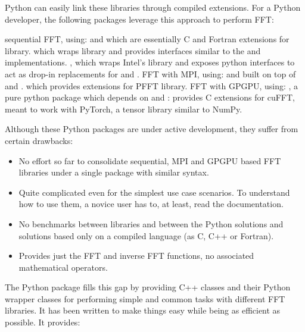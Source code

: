 Python can easily link these libraries through compiled extensions. For a Python
developer, the following packages leverage this approach to perform FFT:

\begin{outline}
  \1 sequential FFT, using:
    \2  and  which are essentially
    C and Fortran extensions for  library.
    \2  which wraps  library and provides interfaces similar to
    the  and  implementations.
    \2 , which wraps Intel's  library and exposes python
    interfaces to act as drop-in replacements for  and
    .
  \1 FFT with MPI, using:
    \2  and  built on top of  and
    .
    \2  which provides extensions for
    PFFT library.
  \1 FFT with GPGPU, using:
    \2 , a pure python package which depends on 
    and 
    \2 : provides C extensions for cuFFT, meant to work with
    PyTorch, a tensor library similar to NumPy.
\end{outline}

Although these Python packages are under active development, they suffer from
certain drawbacks:

\begin{itemize}
  \item No effort so far to consolidate sequential, MPI and GPGPU based FFT
  libraries under a single package with similar syntax.

  \item Quite complicated even for the simplest use case scenarios. To
  understand how to use them, a novice user has to, at least, read the
   documentation.

  \item No benchmarks between libraries and between the Python
  solutions and solutions based only on a compiled language (as C, C++ or
  Fortran).

  \item Provides just the FFT and inverse FFT functions, no associated
  mathematical operators.

\end{itemize}

The Python package  fills this gap by providing C++ classes and
their Python wrapper classes for performing simple and common tasks with different
FFT libraries. It has been written to make things easy while being as efficient as
possible. It provides:

